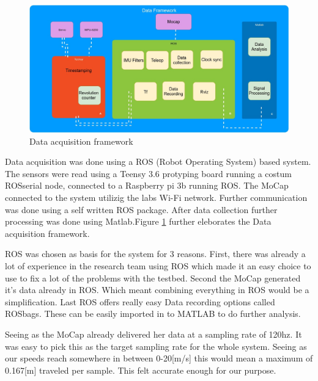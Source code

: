 \begin{figure}
  \centering
    \includegraphics[scale=0.22]{figure/DataFramework.jpg}
  \caption{Data acquisition framework}
  \label{fig:DonutFramework} 
\end{figure}

Data acquisition was done using a ROS (Robot Operating System) based system. The sensors were read using a Teensy 3.6 protyping board running a costum ROSserial node, connected to a Raspberry pi 3b running ROS. The MoCap connected to the system utilizig the labs Wi-Fi network. Further communication was done using a self written ROS package. After data collection further processing was done using Matlab.Figure
\ref{fig:DonutFramework} further eleborates the Data acquisition framework.

ROS was chosen as basis for the system for 3 reasons. First, there was already a lot of experience in the research team using ROS which made it an easy choice to use to fix a lot of the problems with the testbed. Second the MoCap generated it's data already in ROS. Which meant combining everything in ROS would be a simplification. Last ROS offers really easy Data recording options called ROSbags. These can be easily imported in to MATLAB to do further analysis.

Seeing as the MoCap already delivered her data at a sampling rate of 120hz. It was easy to pick this as the target sampling rate for the whole system. Seeing as our speeds reach somewhere in between 0-20[m/s] this would mean a maximum of 0.167[m] traveled per sample. This felt accurate enough for our purpose.

